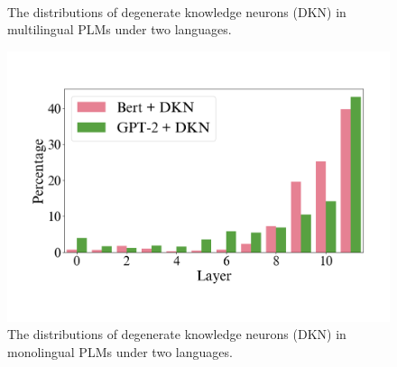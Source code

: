 \documentclass[]{article}
\begin{document}
\begin{figure}[h]
  \centering
  \\
  \caption{The distributions of degenerate knowledge neurons (DKN) in multilingual PLMs under two languages.}
  \label{fig:d}
\end{figure}
\begin{figure}[h]
  \centering
  \includegraphics[width=0.8\linewidth]{figures/mono-d.pdf}
  \caption{The distributions of degenerate knowledge neurons (DKN) in monolingual PLMs under two languages.}
  \label{fig:mono-D-neurons_distribution}
\end{figure}
\end{document}
